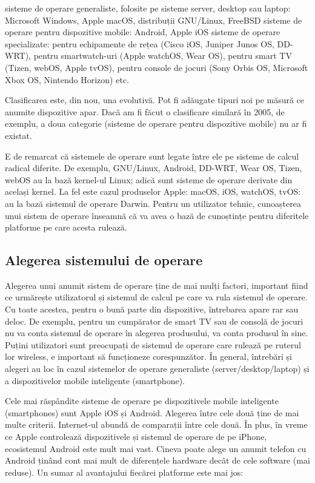 sisteme de operare generaliste, folosite pe sisteme server, desktop sau laptop: Microsoft Windows, Apple macOS, distribuții GNU/Linux, FreeBSD
sisteme de operare pentru dispozitive mobile: Android, Apple iOS
sisteme de operare specializate: pentru echipamente de rețea (Cisco iOS, Juniper Junos OS, DD-WRT), pentru smartwatch-uri (Apple watchOS, Wear OS), pentru smart TV (Tizen, webOS, Apple tvOS), pentru console de jocuri (Sony Orbis OS, Microsoft Xbox OS, Nintendo Horizon) etc.

Clasificarea este, din nou, una evolutivă. Pot fi adăugate tipuri noi pe măsură ce anumite dispozitive apar. Dacă am fi făcut o clasificare similară în 2005, de exemplu, a doua categorie (sisteme de operare pentru dispozitive mobile) nu ar fi existat.

E de remarcat că sistemele de operare sunt legate între ele pe sisteme de calcul radical diferite. De exemplu, GNU/Linux, Android, DD-WRT, Wear OS, Tizen, webOS au la bază kernel-ul Linux; adică sunt sisteme de operare derivate din același kernel. La fel este cazul produselor Apple: macOS, iOS, watchOS, tvOS: au la bază sistemul de operare Darwin. Pentru un utilizator tehnic, cunoașterea unui sistem de operare înseamnă că va avea o bază de cunoștințe pentru diferitele platforme pe care acesta rulează.

\subsection{Alegerea sistemului de operare}
\label{sec:intro:pick}

Alegerea unui anumit sistem de operare ține de mai mulți factori, important fiind ce urmărește utilizatorul și sistemul de calcul pe care va rula sistemul de operare. Cu toate acestea, pentru o bună parte din dispozitive, întrebarea apare rar sau deloc. De exemplu, pentru un cumpărator de smart TV sau de consolă de jocuri nu va conta sistemul de operare în alegerea produsului, va conta produsul în sine. Puțini utilizatori sunt preocupați de sistemul de operare care rulează pe ruterul lor wireless, e important să funcționeze corespunzător. În general, întrebări și alegeri au loc în cazul sistemelor de operare generaliste (server/desktop/laptop) și a dispozitivelor mobile inteligente (smartphone).

Cele mai răspândite sisteme de operare pe dispozitivele mobile inteligente (smartphones) sunt Apple iOS și Android. Alegerea între cele două ține de mai multe criterii. Internet-ul abundă de comparații între cele două. În plus, în vreme ce Apple controlează dispozitivele și sistemul de operare de pe iPhone, ecosistemul Android este mult mai vast. Cineva poate alege un anumit telefon cu Android ținând cont mai mult de diferențele hardware decât de cele software (mai reduse). Un sumar al avantajului fiecărei platforme este mai jos:

